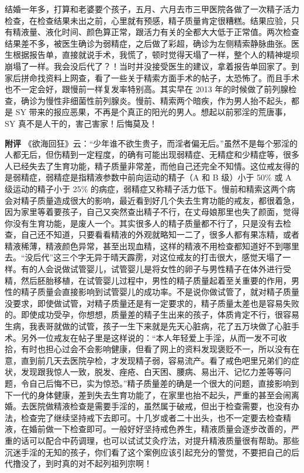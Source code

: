 \begin{case}
    结婚一年多，打算和老婆要个孩子，五月、六月去市三甲医院各做了一次精子活力检查，在检查结果未出之前，心里就有预感，精子质量肯定很糟糕。结果应验，只有精液量、液化时间、颜色算正常，跟活力有关的全都大大低于正常值。两次检查结果差不多，被医生确诊为弱精症，之后做了彩超，确诊为左侧精索静脉曲张。医生根据报告单，直接就说手术，我慌了，顿时觉得天塌了一样，整个人的精神堤坝崩塌了一样。我会没后代了？！当时并没接受医生的建议，拿着报告单回家了。到家后拼命找资料上网查，看了一些关于精索方面手术的帖子，太恐怖了。而且手术也不一定会好，跟慢前一样复发率特别高。其实早在 2013 年的时候做了前列腺检查，确诊为慢性非细菌性前列腺炎。慢前、精索两个暗疾，作为男人抬不起头，都是 SY 带来的报应恶果，不再是个真正的阳光的男人。想起以前邪淫的荒唐事，SY 真不是人干的，害己害家！后悔莫及！

    \textbf{附评} 《欲海回狂》云：“少年谁不欲生贵子，而淫者偏无后。”虽然不是每个邪淫的人都无后，但伤精到一定程度，的确有可能出现弱精症、无精症和少精症等，很多人已经失去了生育功能，精子质量非常差，而他自己还完全不知情。这位戒友得的是弱精症，弱精症是指精液参数中前向运动的精子（A 和 B 级）小于 50\% 或 A 级运动的精子小于 25\% 的病症，弱精症又称精子活力低下。慢前和精索这两个病会对精子质量造成很大的影响，最近看到好几个失去生育功能的戒友，都很着急，因为家里等着要孩子，自己又突然查出精子不行，在丈母娘那里也失了颜面，觉得你没有生育功能，是废人一个。其实很多人的精子质量都不行了，只是没有去检查，自己还不知道，只要看看精液的外观就略知一二了，很多人都有果冻精，或者精液稀薄，精液颜色异常，甚至出现血精，这样的精液不用检查都知道好不到哪里去。“没后代”这三个字无异于晴天霹雳，对这位戒友的打击很大，感觉天塌了一样。有的人会说做试管婴儿，试管婴儿是将女性的卵子与男性精子在体外进行受精，然后胚胎移植，在试管婴儿过程中，男性的精子质量起着至关重要的作用，男性的精子质量会直接影响到试管婴儿的成功率。不是说你做试管了，就对精子质量没要求，即使做试管，对精子质量还是有一定要求的，精子质量太差也是容易失败的。即使成功受孕，你想想，质量差的精子生出来的孩子，体质肯定不行，很容易生病，我表哥就做的试管，孩子一生下来就是先天心脏病，花了五万块做了心脏手术。另外一位戒友在帖子里是这样说的：“本人年轻爱上手淫，从而一发不可收拾，有时也担心过会不会影响健康，但看了网上的资料发现褒贬不一，所以没有在意，直到前几天去医院孕检，才发现精子弱，容易流产。看了戒色吧里兄弟们的症状，发现跟我惊人一致，脱发、痤疮、白天困、腰病、易出汗、记忆力差等等问题，令自己后悔不已，实为惊恐。”精子质量差的确是一个很大的问题，直接影响到下一代的身体健康，差到失去生育功能了，在家里也抬不起头，严重的甚至会闹离婚。去医院做精液检查是需要手淫的，虽然属于破戒，但出于检查需要，也没有办法，检查完了继续坚持戒下去即可。十几岁或者二十出头，也不一定要去检查精液，在婚前做一下检查即可。一般好好坚持戒色养生，精液质量会逐步改善的，严重的话可以配合中药调理，也可以试试艾灸疗法，对提升精液质量很有帮助。那些沉迷手淫的无知的孩子，你们看了这个案例应该引起充分的警觉，不要把自己的后代撸没了，到时真的对不起列祖列宗啊！
\end{case}

